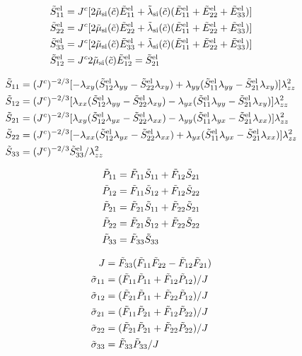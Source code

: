 \documentclass[../main.tex]{subfiles}
\begin{document}
\begin{align}
    \tSel{11} &= \jc[2 \tmusi(\tc) \tEel{11} + \tlamsi(\tc)(\tEel{11} + \tEel{22} + \tEel{33}) ]\\
    \tSel{22} &= \jc[2 \tmusi(\tc) \tEel{22} + \tlamsi(\tc)(\tEel{11} + \tEel{22} + \tEel{33}) ]\\
    \tSel{33} &= \jc[2 \tmusi(\tc) \tEel{33} + \tlamsi(\tc)(\tEel{11} + \tEel{22} + \tEel{33}) ]\\
    \tSel{12} &= \jc2 \tmusi(\tc) \tEel{12} =\tSel{21}\\
\end{align}

\begin{align}
\tS{11} &= (\jc)^{-2/3}[-\lamxy(\tSel{12} \lamyy - \tSel{22} \lamxy) + \lamyy(\tSel{11} \lamyy - \tSel{21} \lamxy)] \lambda^2_{zz} \\
\tS{12} &= (\jc)^{-2/3}[\lamxx(\tSel{12} \lamyy - \tSel{22} \lamxy)  -\lamyx(\tSel{11} \lamyy - \tSel{21} \lamxy)] \lambda^2_{zz} \\
\tS{21} &= (\jc)^{-2/3}[\lamxy(\tSel{12} \lamyx - \tSel{22} \lamxx)  -\lamyy(\tSel{11} \lamyx - \tSel{21} \lamxx)] \lambda^2_{zz} \\
\tS{22} &= (\jc)^{-2/3}[-\lamxx(\tSel{12} \lamyx - \tSel{22} \lamxx)  + \lamyx(\tSel{11} \lamyx - \tSel{21} \lamxx)] \lambda^2_{zz} \\
\tS{33} &= (\jc)^{-2/3} \tSel{33}/\lambda^2_{zz}
\end{align}


\begin{align}
    \tP{11} &= \tF{11} \tS{11} + \tF{12} \tS{21} \\
    \tP{12} &= \tF{11} \tS{12} + \tF{12} \tS{22} \\
    \tP{21} &= \tF{21} \tS{11} + \tF{22} \tS{21} \\
    \tP{22} &= \tF{21} \tS{12} + \tF{22} \tS{22} \\
    \tP{33} &= \tF{33} \tS{33}
\end{align}

\begin{align}
    J &= \tF{33}(\tF{11} \tF{22} - \tF{12} \tF{21}) \\
    \tsigma{11} &= (\tF{11} \tP{11} + \tF{12} \tP{12})/J \\
    \tsigma{12} &= (\tF{21} \tP{11} + \tF{22} \tP{12})/J \\
    \tsigma{21} &= (\tF{11} \tP{21} + \tF{12} \tP{22})/J \\
    \tsigma{22} &= (\tF{21} \tP{21} + \tF{22} \tP{22})/J \\
    \tsigma{33} &= \tF{33} \tP{33}/J \\
\end{align}
\end{document}
